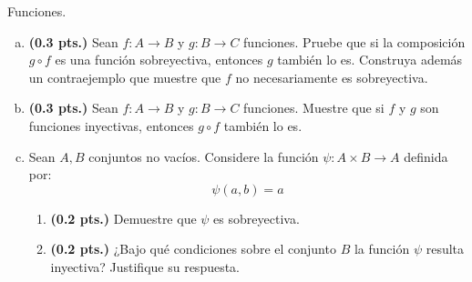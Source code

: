 \begin{problema}{Funciones.}
	\begin{enumerate}[(a)]
		\item \textbf{(0.3 pts.)} Sean $f : A \rightarrow B$ y $g: B \rightarrow C$ funciones. Pruebe que si la composición $g \circ f$ es una función sobreyectiva, entonces $g$ también lo es. Construya además un contraejemplo que muestre que $f$ no necesariamente es sobreyectiva. 
		
		\item \textbf{(0.3 pts.)} Sean $f : A \rightarrow B$ y $g: B \rightarrow C$ funciones. Muestre que si $f$ y $g$ son funciones inyectivas, entonces $g \circ f$ también lo es. 
		
		\item Sean $A, B$ conjuntos no vacíos. Considere la función $\psi: A \times B \rightarrow A$ definida por: $$ \psi(a, b) = a $$ 
		
		\begin{enumerate}
			\item \textbf{(0.2 pts.)} Demuestre que $\psi$ es sobreyectiva. 
			\item \textbf{(0.2 pts.)} ¿Bajo qué condiciones sobre el conjunto $B$ la función $\psi$ resulta inyectiva? Justifique su respuesta. 
		\end{enumerate}
	\end{enumerate}
\end{problema}

